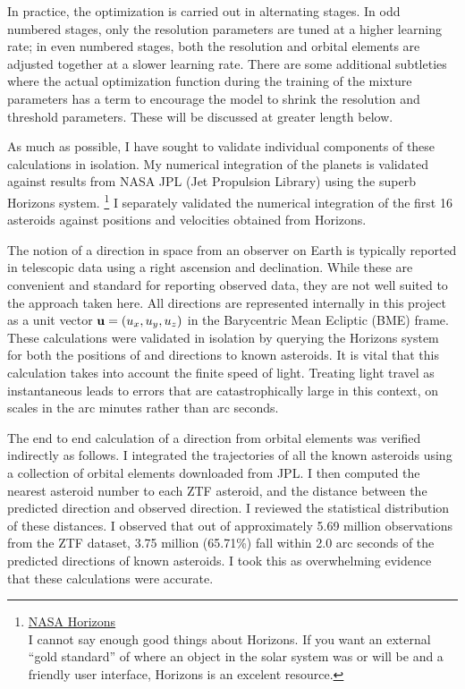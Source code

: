 In practice, the optimization is carried out in alternating stages.
In odd numbered stages, only the resolution parameters are tuned at a higher learning rate;
in even numbered stages, both the resolution and orbital elements are adjusted together at a slower learning rate.
There are some additional subtleties where the actual optimization function during the training of the mixture
parameters has a term to encourage the model to shrink the resolution and threshold parameters.
These will be discussed at greater length below.

As much as possible, I have sought to validate individual components of these calculations in isolation.
My numerical integration of the planets is validated against results from NASA JPL (Jet Propulsion Library)
using the superb Horizons system.
\footnote{
\href{https://ssd.jpl.nasa.gov/horizons.cgi}{NASA Horizons} \\
I cannot say enough good things about Horizons.
If you want an external ``gold standard'' of where an object in the solar system was or will be 
and a friendly user interface, Horizons is an excelent resource.}
I separately validated the numerical integration of the first 16 asteroids against positions and velocities obtained from Horizons.

The notion of a direction in space from an observer on Earth is typically reported in telescopic data using a right ascension and declination.
While these are convenient and standard for reporting observed data, they are not well suited to the approach taken here.
All directions are represented internally in this project as a unit vector $\mathbf{u} = (u_x, u_y, u_z)$ in the Barycentric Mean Ecliptic (BME) frame.
These calculations were validated in isolation by querying the Horizons system for both the positions of and directions to known asteroids.
It is vital that this calculation takes into account the finite speed of light.
Treating light travel as instantaneous leads to errors that are catastrophically large in this context, on scales in the arc minutes rather than arc seconds.

The end to end calculation of a direction from orbital elements was verified indirectly as follows.
I integrated the trajectories of all the known asteroids using a collection of orbital elements downloaded from JPL.
I then computed the nearest asteroid number to each ZTF asteroid, and the distance between the predicted direction and observed direction.
I reviewed the statistical distribution of these distances.
I observed that out of approximately 5.69 million observations from the ZTF dataset,
3.75 million (65.71\%) fall within 2.0 arc seconds of the predicted directions of known asteroids.
I took this as overwhelming evidence that these calculations were accurate.


